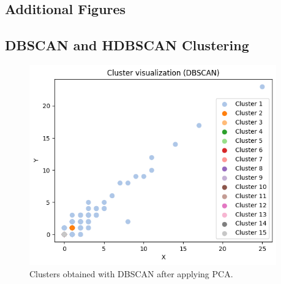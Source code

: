 \begin{appendices}

	\chapter{Additional Figures}
	\label{app:additional_figures}

	\section{DBSCAN and HDBSCAN Clustering}
	\label{app:dbscan_hdbscan_clustering}

	\begin{figure}[H]
		\centering
		\begin{minipage}[t]{0.48\textwidth}
			\centering
			\includegraphics[width=0.95\textwidth]{../imgs/graphs/clustering/dbscan_nopca.png}
			\caption{Clusters obtained with DBSCAN after applying PCA.}
			\label{fig:clusters_dbscan_no_pca}
		\end{minipage}\hfill
		\begin{minipage}[t]{0.48\textwidth}
			\centering

\end{minipage}
\end{figure}
\end{appendices}

